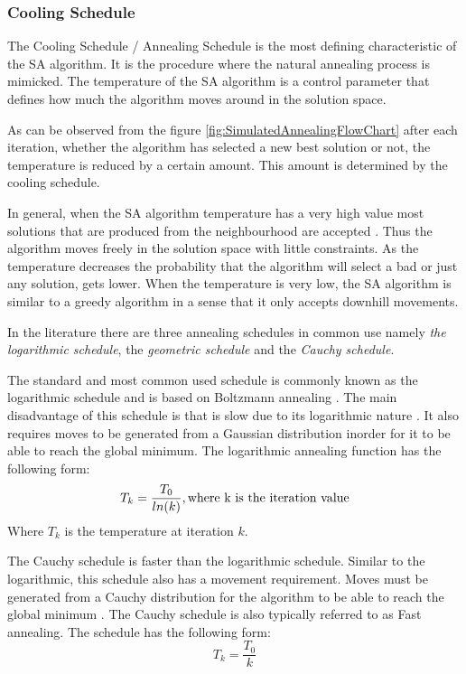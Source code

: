 \subsubsection{Cooling Schedule}
The Cooling Schedule / Annealing Schedule is the most defining characteristic of the SA algorithm. It is the procedure where the natural annealing process is mimicked. The temperature of the SA algorithm is a control parameter that defines how much the algorithm moves around in the solution space.

As can be observed from the figure \ref{fig:SimulatedAnnealingFlowChart} after each iteration, whether the algorithm has selected a new best solution or not, the temperature is reduced by a certain amount. This amount is determined by the cooling schedule.

In general, when the SA algorithm temperature has a very high value most solutions that are produced from the neighbourhood are accepted \cite{ClusterSA}. Thus the algorithm moves freely in the solution space with little constraints. As the temperature decreases the probability that the algorithm will select a bad or just any solution, gets lower. When the temperature is very low, the SA algorithm is similar to a greedy algorithm in a sense that it only accepts downhill movements\cite{ClusterSA}.

In the literature there are three annealing schedules in common use namely \emph{the logarithmic schedule}, the \emph{geometric schedule} and the \emph{Cauchy schedule}\cite{VeryFastSAImageEnchancement,SASingleMultiObj}. 

The standard and most common used schedule is commonly known as the logarithmic schedule and is based on Boltzmann annealing \cite{VeryFastSAImageEnchancement}. The main disadvantage of this schedule is that is slow due to its logarithmic nature \cite{VeryFastSAImageEnchancement}. It also requires moves to be generated from a Gaussian distribution inorder for it to be able to reach the global minimum\cite{SASingleMultiObj}. The logarithmic annealing function has the following form:
\begin{equation}
\label{eq:logcooling}
	T_k = \frac{T_0}{ln(k)},\text{where k is the iteration value}\\
\end{equation}
Where $T_k$ is the temperature at iteration $k$.

The Cauchy schedule is faster than the logarithmic schedule. Similar to the logarithmic, this schedule also has a movement requirement. Moves must be generated from a Cauchy distribution for the algorithm to be able to reach the global minimum \cite{SASingleMultiObj,VeryFastSAImageEnchancement}. The Cauchy schedule is also typically referred to as Fast annealing\cite{VeryFastSAImageEnchancement}. The schedule has the following form:
\begin{equation}
\label{eq:cauchycooling}
	T_k = \frac{T_0}{k}
\end{equation}

